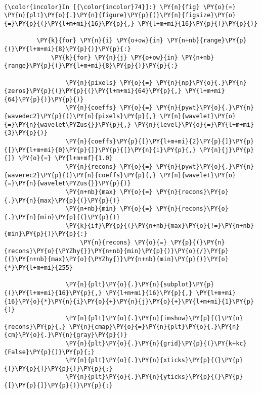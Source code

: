     \begin{center}
    \end{center}
    { \hspace*{\fill} \\}
    
    \begin{Verbatim}[commandchars=\\\{\}]
{\color{incolor}In [{\color{incolor}74}]:} \PY{n}{fig} \PY{o}{=} \PY{n}{plt}\PY{o}{.}\PY{n}{figure}\PY{p}{(}\PY{n}{figsize}\PY{o}{=}\PY{p}{(}\PY{l+m+mi}{16}\PY{p}{,} \PY{l+m+mi}{16}\PY{p}{)}\PY{p}{)}
         
         \PY{k}{for} \PY{n}{i} \PY{o+ow}{in} \PY{n+nb}{range}\PY{p}{(}\PY{l+m+mi}{8}\PY{p}{)}\PY{p}{:}
             \PY{k}{for} \PY{n}{j} \PY{o+ow}{in} \PY{n+nb}{range}\PY{p}{(}\PY{l+m+mi}{8}\PY{p}{)}\PY{p}{:}
         
                 \PY{n}{pixels} \PY{o}{=} \PY{n}{np}\PY{o}{.}\PY{n}{zeros}\PY{p}{(}\PY{p}{(}\PY{l+m+mi}{64}\PY{p}{,} \PY{l+m+mi}{64}\PY{p}{)}\PY{p}{)}
                 \PY{n}{coeffs} \PY{o}{=} \PY{n}{pywt}\PY{o}{.}\PY{n}{wavedec2}\PY{p}{(}\PY{n}{pixels}\PY{p}{,} \PY{n}{wavelet}\PY{o}{=}\PY{n}{wavelet\PYZus{}}\PY{p}{,} \PY{n}{level}\PY{o}{=}\PY{l+m+mi}{3}\PY{p}{)}
                 \PY{n}{coeffs}\PY{p}{[}\PY{l+m+mi}{2}\PY{p}{]}\PY{p}{[}\PY{l+m+mi}{0}\PY{p}{]}\PY{p}{[}\PY{n}{i}\PY{p}{,} \PY{n}{j}\PY{p}{]} \PY{o}{=} \PY{l+m+mf}{1.0}
                 \PY{n}{recons} \PY{o}{=} \PY{n}{pywt}\PY{o}{.}\PY{n}{waverec2}\PY{p}{(}\PY{n}{coeffs}\PY{p}{,} \PY{n}{wavelet}\PY{o}{=}\PY{n}{wavelet\PYZus{}}\PY{p}{)}
                 \PY{n+nb}{max} \PY{o}{=} \PY{n}{recons}\PY{o}{.}\PY{n}{max}\PY{p}{(}\PY{p}{)}
                 \PY{n+nb}{min} \PY{o}{=} \PY{n}{recons}\PY{o}{.}\PY{n}{min}\PY{p}{(}\PY{p}{)}
                 \PY{k}{if}\PY{p}{(}\PY{n+nb}{max}\PY{o}{!=}\PY{n+nb}{min}\PY{p}{)}\PY{p}{:}
                     \PY{n}{recons} \PY{o}{=} \PY{p}{(}\PY{n}{recons}\PY{o}{\PYZhy{}}\PY{n+nb}{min}\PY{p}{)}\PY{o}{/}\PY{p}{(}\PY{n+nb}{max}\PY{o}{\PYZhy{}}\PY{n+nb}{min}\PY{p}{)}\PY{o}{*}\PY{l+m+mi}{255}
                     
                 \PY{n}{plt}\PY{o}{.}\PY{n}{subplot}\PY{p}{(}\PY{l+m+mi}{16}\PY{p}{,} \PY{l+m+mi}{16}\PY{p}{,} \PY{l+m+mi}{16}\PY{o}{*}\PY{n}{i}\PY{o}{+}\PY{n}{j}\PY{o}{+}\PY{l+m+mi}{1}\PY{p}{)}
                 \PY{n}{plt}\PY{o}{.}\PY{n}{imshow}\PY{p}{(}\PY{n}{recons}\PY{p}{,} \PY{n}{cmap}\PY{o}{=}\PY{n}{plt}\PY{o}{.}\PY{n}{cm}\PY{o}{.}\PY{n}{gray}\PY{p}{)}
                 \PY{n}{plt}\PY{o}{.}\PY{n}{grid}\PY{p}{(}\PY{k+kc}{False}\PY{p}{)}\PY{p}{;}
                 \PY{n}{plt}\PY{o}{.}\PY{n}{xticks}\PY{p}{(}\PY{p}{[}\PY{p}{]}\PY{p}{)}\PY{p}{;}
                 \PY{n}{plt}\PY{o}{.}\PY{n}{yticks}\PY{p}{(}\PY{p}{[}\PY{p}{]}\PY{p}{)}\PY{p}{;}
\end{Verbatim}


